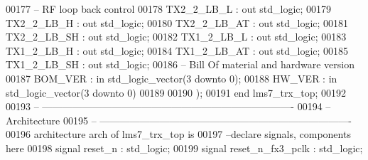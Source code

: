 \begin{DoxyCode}
00177 \textcolor{keyword}{         -- RF loop back control }
00178       \textcolor{vhdlchar}{TX2_2_LB_L}        \textcolor{vhdlchar}{:} \textcolor{keywordflow}{out}    \textcolor{comment}{std\_logic};
00179       \textcolor{vhdlchar}{TX2_2_LB_H}        \textcolor{vhdlchar}{:} \textcolor{keywordflow}{out}    \textcolor{comment}{std\_logic};
00180       \textcolor{vhdlchar}{TX2_2_LB_AT}       \textcolor{vhdlchar}{:} \textcolor{keywordflow}{out}    \textcolor{comment}{std\_logic};
00181       \textcolor{vhdlchar}{TX2_2_LB_SH}       \textcolor{vhdlchar}{:} \textcolor{keywordflow}{out}    \textcolor{comment}{std\_logic};
00182       \textcolor{vhdlchar}{TX1_2_LB_L}        \textcolor{vhdlchar}{:} \textcolor{keywordflow}{out}    \textcolor{comment}{std\_logic};
00183       \textcolor{vhdlchar}{TX1_2_LB_H}        \textcolor{vhdlchar}{:} \textcolor{keywordflow}{out}    \textcolor{comment}{std\_logic};
00184       \textcolor{vhdlchar}{TX1_2_LB_AT}       \textcolor{vhdlchar}{:} \textcolor{keywordflow}{out}    \textcolor{comment}{std\_logic};
00185       \textcolor{vhdlchar}{TX1_2_LB_SH}       \textcolor{vhdlchar}{:} \textcolor{keywordflow}{out}    \textcolor{comment}{std\_logic};   
00186 \textcolor{keyword}{         -- Bill Of material and hardware version }
00187       \textcolor{vhdlchar}{BOM_VER}           \textcolor{vhdlchar}{:} \textcolor{keywordflow}{in}     \textcolor{comment}{std\_logic\_vector}\textcolor{vhdlchar}{(}\textcolor{vhdllogic}{}\textcolor{vhdllogic}{3} \textcolor{keywordflow}{downto} \textcolor{vhdllogic}{}\textcolor{vhdllogic}{0}\textcolor{vhdlchar}{)};
00188       \textcolor{vhdlchar}{HW_VER}            \textcolor{vhdlchar}{:} \textcolor{keywordflow}{in}     \textcolor{comment}{std\_logic\_vector}\textcolor{vhdlchar}{(}\textcolor{vhdllogic}{}\textcolor{vhdllogic}{3} \textcolor{keywordflow}{downto} \textcolor{vhdllogic}{}\textcolor{vhdllogic}{0}\textcolor{vhdlchar}{)}
00189 
00190    \textcolor{vhdlchar}{)};
00191 \textcolor{keywordflow}{end} \textcolor{vhdlchar}{lms7\_trx\_top};
00192 
00193 \textcolor{keyword}{-- ----------------------------------------------------------------------------}
00194 \textcolor{keyword}{-- Architecture}
00195 \textcolor{keyword}{-- ----------------------------------------------------------------------------}
00196 \textcolor{keywordflow}{architecture} arch \textcolor{keywordflow}{of} lms7_trx_top is
00197 \textcolor{keyword}{--declare signals,  components here}
00198 \textcolor{keywordflow}{signal} \textcolor{vhdlchar}{reset_n}                   \textcolor{vhdlchar}{:} \textcolor{comment}{std\_logic}; 
00199 \textcolor{keywordflow}{signal} \textcolor{vhdlchar}{reset_n_fx3_pclk}          \textcolor{vhdlchar}{:} \textcolor{comment}{std\_logic};

\end{DoxyCode}
